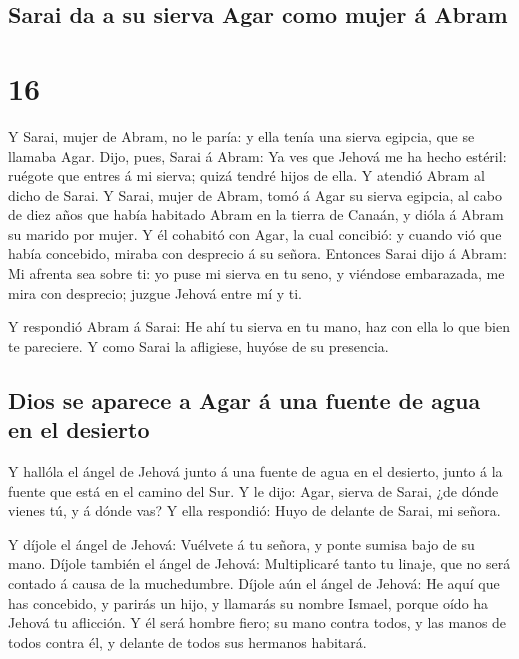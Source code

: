 \hypertarget{sarai-da-a-su-sierva-agar-como-mujer-uxe1-abram}{%
\subsection{Sarai da a su sierva Agar como mujer á
Abram}\label{sarai-da-a-su-sierva-agar-como-mujer-uxe1-abram}}

\hypertarget{section-01-16}{%
\section{16}\label{section-01-16}}

 Y Sarai, mujer de Abram, no le paría: y ella tenía una
sierva egipcia, que se llamaba Agar.  Dijo, pues, Sarai á
Abram: Ya ves que Jehová me ha hecho estéril: ruégote que entres á mi
sierva; quizá tendré hijos de ella. Y atendió Abram al dicho de Sarai.
 Y Sarai, mujer de Abram, tomó á Agar su sierva egipcia,
al cabo de diez años que había habitado Abram en la tierra de Canaán, y
dióla á Abram su marido por mujer.  Y él cohabitó con
Agar, la cual concibió: y cuando vió que había concebido, miraba con
desprecio á su señora.  Entonces Sarai dijo á Abram: Mi
afrenta sea sobre ti: yo puse mi sierva en tu seno, y viéndose
embarazada, me mira con desprecio; juzgue Jehová entre mí y ti.

 Y respondió Abram á Sarai: He ahí tu sierva en tu mano,
haz con ella lo que bien te pareciere. Y como Sarai la afligiese, huyóse
de su presencia.

\hypertarget{dios-se-aparece-a-agar-uxe1-una-fuente-de-agua-en-el-desierto}{%
\subsection{Dios se aparece a Agar á una fuente de agua en el
desierto}\label{dios-se-aparece-a-agar-uxe1-una-fuente-de-agua-en-el-desierto}}

 Y hallóla el ángel de Jehová junto á una fuente de agua
en el desierto, junto á la fuente que está en el camino del Sur.
 Y le dijo: Agar, sierva de Sarai, ¿de dónde vienes tú, y
á dónde vas? Y ella respondió: Huyo de delante de Sarai, mi señora.

 Y díjole el ángel de Jehová: Vuélvete á tu señora, y
ponte sumisa bajo de su mano.  Díjole también el ángel de
Jehová: Multiplicaré tanto tu linaje, que no será contado á causa de la
muchedumbre.  Díjole aún el ángel de Jehová: He aquí que
has concebido, y parirás un hijo, y llamarás su nombre Ismael, porque
oído ha Jehová tu aflicción.  Y él será hombre fiero; su
mano contra todos, y las manos de todos contra él, y delante de todos
sus hermanos habitará.

